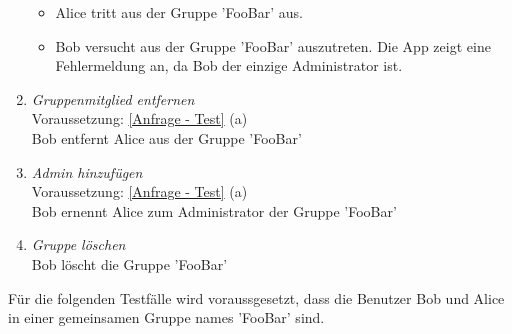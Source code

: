 \documentclass[parskip=full]{scrartcl}
\def\threedigits#1{%
  \ifnum#1<100 0\fi
  \ifnum#1<10 0\fi
  \number#1}
\begin{document}
\begin{enumerate}[label={\textbf{/T\protect\threedigits{\theenumi}0/}}, leftmargin=*, resume]
\begin{itemize}
		\item Alice tritt aus der Gruppe 'FooBar' aus.
		\item Bob versucht aus der Gruppe 'FooBar' auszutreten. Die App zeigt eine Fehlermeldung an, da Bob der einzige Administrator ist.
	\end{itemize}
	\item \textit{Gruppenmitglied entfernen} \\
	Voraussetzung: \ref{Anfrage - Test} (a) \\
	Bob entfernt Alice aus der Gruppe 'FooBar'
	\item \textit{Admin hinzufügen} \\
	Voraussetzung: \ref{Anfrage - Test} (a) \\
	Bob ernennt Alice zum Administrator der Gruppe 'FooBar'
	\item \textit{Gruppe löschen} \\
	Bob löscht die Gruppe 'FooBar'
\end{enumerate}
Für die folgenden Testfälle wird voraussgesetzt, dass die Benutzer Bob und Alice in einer gemeinsamen Gruppe names 'FooBar' sind.
\end{document}
